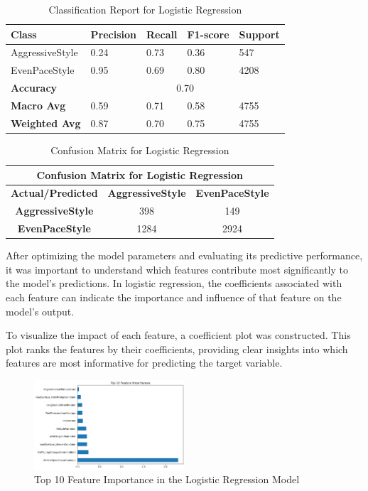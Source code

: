 \documentclass[10pt,journal,compsoc]{IEEEtran}
\begin{document}
\begin{table}[h]
    \centering    
    \begin{tabular}{|l|l|l|l|l|}
    \hline
    \textbf{Class} & \textbf{Precision} & \textbf{Recall} & \textbf{F1-score} & \textbf{Support} \\ \hline
    AggressiveStyle & 0.24 & 0.73 & 0.36 & 547 \\ \hline
    EvenPaceStyle & 0.95 & 0.69 & 0.80 & 4208 \\ \hline
    \textbf{Accuracy} & \multicolumn{4}{c|}{0.70} \\ \hline
    \textbf{Macro Avg} & 0.59 & 0.71 & 0.58 & 4755 \\ \hline
    \textbf{Weighted Avg} & 0.87 & 0.70 & 0.75 & 4755 \\ \hline
    \end{tabular}
    \caption{Classification Report for Logistic Regression}
    \label{table:log_classification_report}
\end{table}

\begin{table}[h]
    \centering
    \begin{tabular}{|c|c|c|}
    \hline
    \multicolumn{3}{|c|}{\textbf{Confusion Matrix for Logistic Regression}} \\
    \hline
    \textbf{Actual/Predicted} & \textbf{AggressiveStyle} & \textbf{EvenPaceStyle} \\ \hline
    \textbf{AggressiveStyle} & 398 & 149 \\ \hline
    \textbf{EvenPaceStyle} & 1284 & 2924 \\ \hline
    \end{tabular}
    \caption{Confusion Matrix for Logistic Regression}
    \label{table:log_confusion_matrix}
\end{table}

After optimizing the model parameters and evaluating its predictive performance, it was important to understand which features contribute most significantly to the model's predictions. 
In logistic regression, the coefficients associated with each feature can indicate the importance and influence of that feature on the model's output. 

To visualize the impact of each feature, a coefficient plot was constructed. This plot ranks the features by their coefficients, providing clear insights into which features are 
most informative for predicting the target variable.

\begin{figure}[h]
    \centering
    \includegraphics[width=0.5\textwidth]{images/feature_importance.png} 
    \caption{Top 10 Feature Importance in the Logistic Regression Model}
    \label{fig:feature_importances}
\end{figure}
\end{document}
